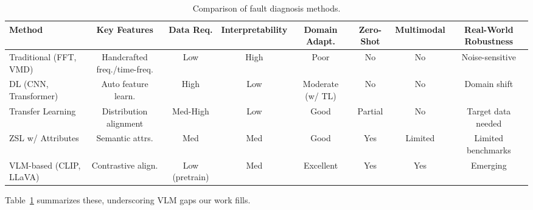 \begin{table}[t]
\centering
\caption{Comparison of fault diagnosis methods.}
\label{tab:comparison}
\begin{tabular}{@{}lccccccc@{}}
\toprule
Method & Key Features & Data Req. & Interpretability & Domain Adapt. & Zero-Shot & Multimodal & Real-World Robustness \\
\midrule
Traditional (FFT, VMD) & Handcrafted freq./time-freq. & Low & High & Poor & No & No & Noise-sensitive \\
DL (CNN, Transformer) & Auto feature learn. & High & Low & Moderate (w/ TL) & No & No & Domain shift \\
Transfer Learning & Distribution alignment & Med-High & Low & Good & Partial & No & Target data needed \\
ZSL w/ Attributes & Semantic attrs. & Med & Med & Good & Yes & Limited & Limited benchmarks \\
VLM-based (CLIP, LLaVA) & Contrastive align. & Low (pretrain) & Med & Excellent & Yes & Yes & Emerging \\
\bottomrule
\end{tabular}
\end{table}

Table~\ref{tab:comparison} summarizes these, underscoring VLM gaps our work fills.
